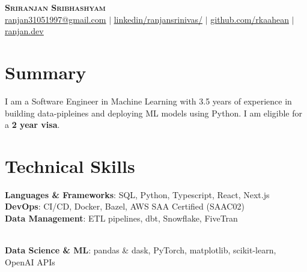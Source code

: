 \documentclass[letterpaper,11pt]{article}
\begin{document}

\begin{center}
    \textbf{\Huge \scshape Sriranjan Sribhashyam} \\ \vspace{2pt}
    \href{mailto:ranjan31051997@gmail.com}{\underline{ranjan31051997@gmail.com}} $|$ 
    \href{https://www.linkedin.com/in/ranjansrinivas/}{\underline{linkedin/ranjansrinivas/}} $|$
    \href{https://github.com/rkaahean}{\underline{github.com/rkaahean}} $|$
    \href{https://ranjan.dev}{\underline{ranjan.dev}}

\end{center}

\section{Summary}
\small{
  I am a Software Engineer in Machine Learning with 3.5 years of experience in building data-pipleines and deploying ML models using Python.
  I am eligible for a \textbf{2 year visa}.
}

\section{Technical Skills}
 \begin{itemize}[leftmargin=0.15in, label={}]
    \small{\item{
     \textbf{Languages \& Frameworks}{: SQL, Python, Typescript, React, Next.js} \\
     \textbf{DevOps}{: CI/CD, Docker, Bazel, AWS SAA Certified (SAA\-C02)} \\
     \textbf{Data Management}{: ETL pipelines, dbt, Snowflake, FiveTran}
    }} \\
    \textbf{Data Science \& ML}{: pandas \& dask, PyTorch, matplotlib, scikit-learn, OpenAI APIs}
 \end{itemize}



\end{document}
